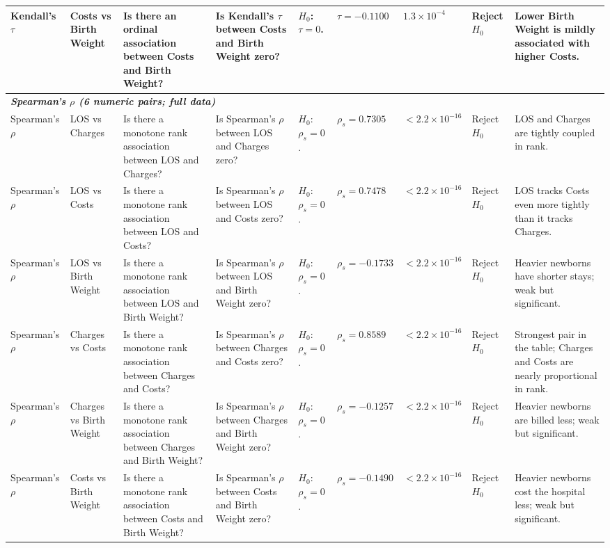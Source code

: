 \documentclass[12pt]{article}
\begin{document}
\begin{landscape}
\begin{scriptsize}
\begin{longtable}{p{2.0cm} p{2.4cm} p{3.0cm} p{2.7cm} p{2.5cm} p{1.7cm} p{1.3cm} p{1.3cm} p{3.0cm}}
Kendall's $\tau$ & Costs vs Birth Weight & Is there an ordinal association between Costs and Birth Weight? & Is Kendall's $\tau$ between Costs and Birth Weight zero? & $H_0$: $\tau = 0$. & $\tau = -0.1100$ & $1.3 \times 10^{-4}$ & Reject $H_0$ & Lower Birth Weight is mildly associated with higher Costs. \\

\midrule
\multicolumn{9}{l}{\textit{\textbf{Spearman's $\rho$ (6 numeric pairs; full data)}}} \\

Spearman's $\rho$ & LOS vs Charges & Is there a monotone rank association between LOS and Charges? & Is Spearman's $\rho$ between LOS and Charges zero? & $H_0$: $\rho_s = 0$. & $\rho_s = 0.7305$ & $< 2.2 \times 10^{-16}$ & Reject $H_0$ & LOS and Charges are tightly coupled in rank. \\

Spearman's $\rho$ & LOS vs Costs & Is there a monotone rank association between LOS and Costs? & Is Spearman's $\rho$ between LOS and Costs zero? & $H_0$: $\rho_s = 0$. & $\rho_s = 0.7478$ & $< 2.2 \times 10^{-16}$ & Reject $H_0$ & LOS tracks Costs even more tightly than it tracks Charges. \\

Spearman's $\rho$ & LOS vs Birth Weight & Is there a monotone rank association between LOS and Birth Weight? & Is Spearman's $\rho$ between LOS and Birth Weight zero? & $H_0$: $\rho_s = 0$. & $\rho_s = -0.1733$ & $< 2.2 \times 10^{-16}$ & Reject $H_0$ & Heavier newborns have shorter stays; weak but significant. \\

Spearman's $\rho$ & Charges vs Costs & Is there a monotone rank association between Charges and Costs? & Is Spearman's $\rho$ between Charges and Costs zero? & $H_0$: $\rho_s = 0$. & $\rho_s = 0.8589$ & $< 2.2 \times 10^{-16}$ & Reject $H_0$ & Strongest pair in the table; Charges and Costs are nearly proportional in rank. \\

Spearman's $\rho$ & Charges vs Birth Weight & Is there a monotone rank association between Charges and Birth Weight? & Is Spearman's $\rho$ between Charges and Birth Weight zero? & $H_0$: $\rho_s = 0$. & $\rho_s = -0.1257$ & $< 2.2 \times 10^{-16}$ & Reject $H_0$ & Heavier newborns are billed less; weak but significant. \\

Spearman's $\rho$ & Costs vs Birth Weight & Is there a monotone rank association between Costs and Birth Weight? & Is Spearman's $\rho$ between Costs and Birth Weight zero? & $H_0$: $\rho_s = 0$. & $\rho_s = -0.1490$ & $< 2.2 \times 10^{-16}$ & Reject $H_0$ & Heavier newborns cost the hospital less; weak but significant. \\


\end{longtable}
\end{scriptsize}
\end{landscape}
\end{document}

